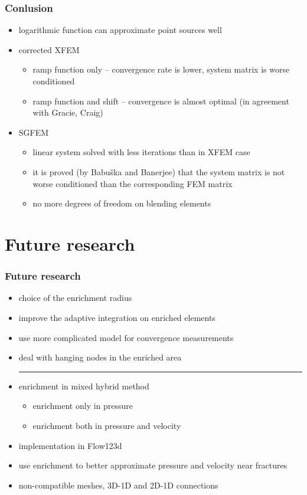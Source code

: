\documentclass[10pt, xcolor=dvipsnames]{beamer} %
\begin{document}
\begin{frame}
  \frametitle{Conlusion}
  \begin{itemize}
  \setlength{\itemsep}{10pt}
    \item logarithmic function can approximate point sources well
    \item corrected XFEM
      \begin{itemize}
        \item ramp function only -- convergence rate is lower, system matrix is worse conditioned
        \item ramp function and shift -- convergence is almost optimal \newline (in agreement with Gracie, Craig)
      \end{itemize}
    
    \item SGFEM
      \begin{itemize}
        \item linear system solved with less iterations than in XFEM case
        \item it is proved (by Babu\v ska and Banerjee) that the system matrix is not worse conditioned than the corresponding FEM matrix
        \item no more degrees of freedom on blending elements
      \end{itemize}
  \end{itemize}
\end{frame}

\section{Future research}
\begin{frame}
  \frametitle{Future research}
  
  \begin{itemize}
  \setlength{\itemsep}{8pt}
    \item choice of the enrichment radius
    \item improve the adaptive integration on enriched elements
    \item use more complicated model for convergence measurements
    \item deal with hanging nodes in the enriched area \newline
          \noindent\rule{\textwidth-1cm}{0.4pt}
    \item enrichment in mixed hybrid method
      \begin{itemize}
        \item enrichment only in pressure 
        \item enrichment both in pressure and velocity
      \end{itemize}
    \item implementation in Flow123d
    \item use enrichment to better approximate pressure and velocity near fractures
    \item non-compatible meshes, 3D-1D and 2D-1D connections
  \end{itemize}
\end{frame}
\end{document}
